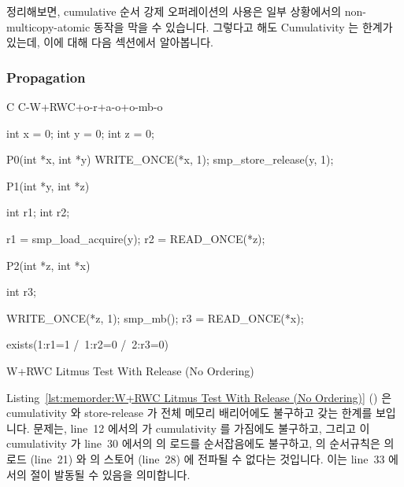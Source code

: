 정리해보면, cumulative 순서 강제 오퍼레이션의 사용은 일부 상황에서의
non-multicopy-atomic 동작을 막을 수 있습니다.
그렇다고 해도 Cumulativity 는 한계가 있는데, 이에 대해 다음 섹션에서
알아봅니다.

\subsubsection{Propagation}
\label{sec:memorder:Propagation}

\begin{listing}[tbp]
{ \scriptsize
\begin{verbbox}[\LstLineNo]
C C-W+RWC+o-r+a-o+o-mb-o

{
int x = 0;
int y = 0;
int z = 0;
}

P0(int *x, int *y)
{
  WRITE_ONCE(*x, 1);
  smp_store_release(y, 1);
}

P1(int *y, int *z)
{
  int r1;
  int r2;

  r1 = smp_load_acquire(y);
  r2 = READ_ONCE(*z);
}

P2(int *z, int *x)
{
  int r3;

  WRITE_ONCE(*z, 1);
  smp_mb();
  r3 = READ_ONCE(*x);
}

exists(1:r1=1 /\ 1:r2=0 /\ 2:r3=0)
\end{verbbox}
}
\centering
\theverbbox
\caption{W+RWC Litmus Test With Release (No Ordering)}
\label{lst:memorder:W+RWC Litmus Test With Release (No Ordering)}
\end{listing}

Listing~\ref{lst:memorder:W+RWC Litmus Test With Release (No Ordering)}
()
은 cumulativity 와 store-release 가 전체 메모리 배리어에도 불구하고 갖는 한계를
보입니다.
문제는, line~12 에서의  가 cumulativity 를 가짐에도
불구하고, 그리고 이 cumulativity 가 line~30 에서의  의 로드를
순서잡음에도 불구하고,  의 순서규칙은  의 로드
(line~21) 와  의 스토어 (line~28) 에 전파될 수 없다는 것입니다.
이는 line~33 에서의  절이 발동될 수 있음을 의미합니다.
\iffalse

